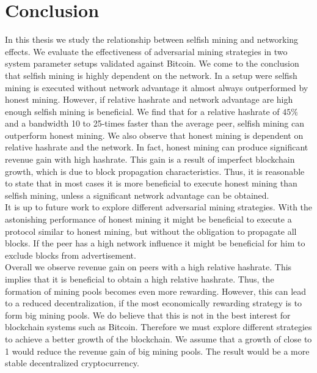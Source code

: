 \chapter{Conclusion}\label{chap:conclusion}
In this thesis we study the relationship between selfish mining and networking effects. We evaluate the effectiveness of adversarial mining strategies in two system parameter setups validated against Bitcoin. We come to the conclusion that selfish mining is highly dependent on the network. In a setup were selfish mining is executed without network advantage it almost always outperformed by honest mining. However, if relative hashrate and network advantage are high enough selfish mining is beneficial. We find that for a relative hashrate of $45\% $ and a bandwidth 10 to 25-times faster than the average peer, selfish mining can outperform honest mining. We also observe that honest mining is dependent on relative hashrate and the network. In fact, honest mining can produce significant revenue gain with high hashrate. This gain is a result of imperfect blockchain growth, which is due to block propagation characteristics. Thus, it is reasonable to state that in most cases it is more beneficial to execute honest mining than selfish mining, unless a significant network advantage can be obtained.\\
It is up to future work to explore different adversarial mining strategies. With the astonishing performance of honest mining it might be beneficial to execute a protocol similar to honest mining, but without the obligation to propagate all blocks. If the peer has a high network influence it might be beneficial for him to exclude blocks from advertisement.\\
Overall we observe revenue gain on peers with a high relative hashrate. This implies that it is beneficial to obtain a high relative hashrate. Thus, the formation of mining pools becomes even more rewarding. However, this can lead to a reduced decentralization, if the most economically rewarding strategy is to form big mining pools. We do believe that this is not in the best interest for blockchain systems such as Bitcoin. Therefore we must explore different strategies to achieve a better growth of the blockchain.  We assume that a growth of close to 1 would reduce the revenue gain of big mining pools. The result would be a more stable decentralized cryptocurrency.